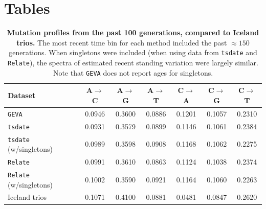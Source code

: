 \documentclass[]{article}
\begin{document}
\clearpage

\section{Tables}

\begin{table}[h]
    \caption{
        \label{tab:recent-spectra}
        \textbf{Mutation profiles from the past 100 generations,
        compared to Iceland trios.}
        The most recent time bin for each method included the past $\approx150$
        generations. When singletons were included (when using data from
        \texttt{tsdate} and \texttt{Relate}), the spectra of estimated
        recent standing variation were largely similar. Note that \texttt{GEVA}
        does not report ages for singletons.
    }
    \centering
    \begin{tabular}[t]{l|cccccc}
        \toprule
        Dataset & A$\rightarrow$C & A$\rightarrow$G & A$\rightarrow$T &
            C$\rightarrow$A & C$\rightarrow$G & C$\rightarrow$T \\
        \midrule
        \texttt{GEVA} & 0.0946 & 0.3600 & 0.0886 & 0.1201 & 0.1057 & 0.2310 \\
        \texttt{tsdate} & 0.0931 & 0.3579 & 0.0899 & 0.1146 & 0.1061 & 0.2384 \\
        \texttt{tsdate} (w/singletons) & 0.0989 & 0.3598 & 0.0908 & 0.1168 & 0.1062 & 0.2275 \\
        \texttt{Relate} & 0.0991 & 0.3610 & 0.0863 & 0.1124 & 0.1038 & 0.2374 \\
        \texttt{Relate} (w/singletons) & 0.1002 & 0.3590 & 0.0921 & 0.1164 & 0.1060 & 0.2263 \\
        \midrule
        Iceland trios & 0.1071 & 0.4100 & 0.0881 & 0.0481 & 0.0847 & 0.2620 \\
        \bottomrule
    \end{tabular}
\end{table}

\clearpage



\end{document}
